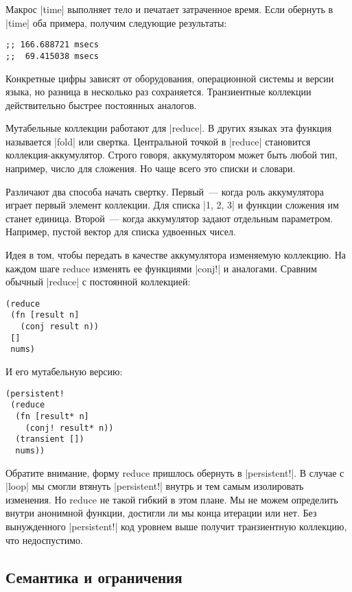 Макрос \spverb|time| выполняет тело и печатает затраченное время. Если обернуть в
\spverb|time| оба примера, получим следующие результаты:

\begin{verbatim}
;; 166.688721 msecs
;;  69.415038 msecs
\end{verbatim}

Конкретные цифры зависят от оборудования, операционной системы и версии языка,
но разница в несколько раз сохраняется. Транзиентные коллекции действительно
быстрее постоянных аналогов.

Мутабельные коллекции работают для \spverb|reduce|. В других языках эта функция
называется \spverb|fold| или свертка. Центральной точкой в \spverb|reduce| становится
коллекция-аккумулятор. Строго говоря, аккумулятором может быть любой тип,
например, число для сложения. Но чаще всего это списки и словари.

Различают два способа начать свертку. Первый~--- когда роль аккумулятора играет
первый элемент коллекции. Для списка \spverb|1, 2, 3| и функции сложения им станет
единица. Второй~--- когда аккумулятор задают отдельным параметром. Например,
пустой вектор для списка удвоенных чисел.

Идея в том, чтобы передать в качестве аккумулятора изменяемую коллекцию. На
каждом шаге reduce изменять ее функциями \spverb|conj!| и аналогами. Сравним обычный
\spverb|reduce| с постоянной коллекцией:

\begin{verbatim}
(reduce
 (fn [result n]
   (conj result n))
 []
 nums)
\end{verbatim}

И его мутабельную версию:

\begin{verbatim}
(persistent!
 (reduce
  (fn [result* n]
    (conj! result* n))
  (transient [])
  nums))
\end{verbatim}

Обратите внимание, форму reduce пришлось обернуть в \spverb|persistent!|. В случае с
\spverb|loop| мы смогли втянуть \spverb|persistent!| внутрь и тем самым изолировать
изменения. Но reduce не такой гибкий в этом плане. Мы не можем определить внутри
анонимной функции, достигли ли мы конца итерации или нет. Без вынужденного
\spverb|persistent!| код уровнем выше получит транзиентную коллекцию, что недоспустимо.

\subsection{Семантика и ограничения}

